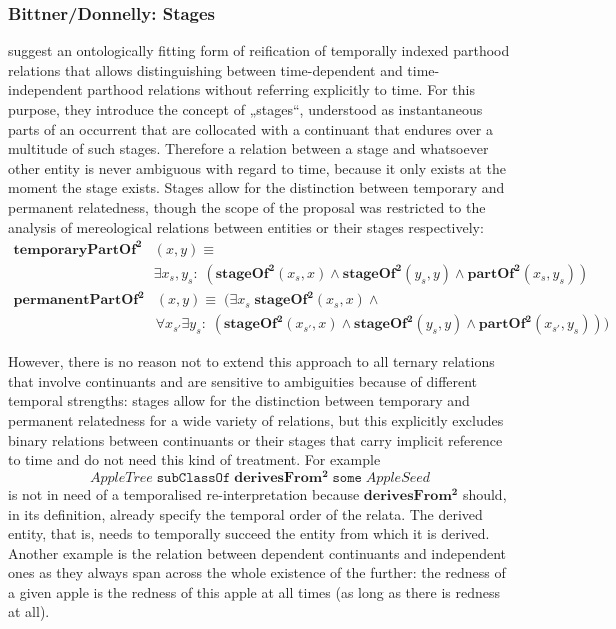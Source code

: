 \documentclass{ao2e}
\newcommand{\mirel}[1]{\ensuremath{\mathrm{\mathbf{#1}}}}
\newcommand{\mclass}[1]{\ensuremath{\mathit{#1}}}
\newcommand{\mrel}[2]{\mirel{#1^#2}}
\newcommand{\mrelb}[1]{\mrel{#1}{2}}
\begin{document}
\subsubsection{Bittner/Donnelly: Stages}
\cite{Bittner:Donnelly} suggest an ontologically fitting form of reification of
temporally indexed parthood relations that allows distinguishing between
time-dependent and time-independent parthood relations without referring
explicitly to time. For this purpose, they introduce the
concept of „stages“, understood as instantaneous parts of an occurrent that are
collocated with a continuant that endures over a multitude of such stages.
Therefore a relation
between a stage and whatsoever other entity is never ambiguous with regard to
time, because it only exists at the moment the stage exists. Stages allow for
the distinction between temporary and permanent relatedness, though the scope of
the proposal was restricted to the analysis of mereological relations between
entities or their stages respectively:
\begin{equation}
\begin{split}
\mrelb{temporaryPartOf}&(x,y) \equiv \\ &\exists x_s,y_s:\; (\mrelb{stageOf}(x_s,x)
  \wedge \mrelb{stageOf}(y_s,y) \wedge
 \mrelb{partOf}(x_s, y_s))
\end{split}
\end{equation}
\begin{equation}
\begin{split}
\mrelb{permanentPartOf}&(x,y) \equiv\; (\exists x_s\; \mrelb{stageOf}(x_s, x)
  \wedge \\
 &\forall x_{s'}\exists y_s:\;(\mrelb{stageOf}(x_{s'},x) \wedge
\mrelb{stageOf}(y_s,y)   \wedge
 \mrelb{partOf}(x_{s'},y_s)))
\end{split}
\end{equation}


However, there is no reason not to extend this approach to all ternary relations
that involve continuants and are sensitive to ambiguities because of different
temporal strengths: stages allow for the distinction between temporary and
permanent relatedness for a wide variety of relations, but this explicitly
excludes binary relations between continuants or their stages that carry
implicit reference to time and do not need this kind of treatment. For example 
\begin{equation}
\mclass{AppleTree}\;\mathtt{subClassOf}\;\mrelb{derivesFrom}\;\mathtt{some}\;
\mclass{AppleSeed}
\end{equation}
is not in need of a temporalised re-interpretation because \mrelb{derivesFrom} should,
in its definition, already specify the temporal order of the relata. The derived
entity, that is, needs to temporally succeed the entity from which it is
derived. Another example is the relation between dependent continuants and
independent ones as they always span across the whole existence of the further:
the redness of a given apple is the redness of this apple at all times (as long
as there is redness at all). 
\end{document}
